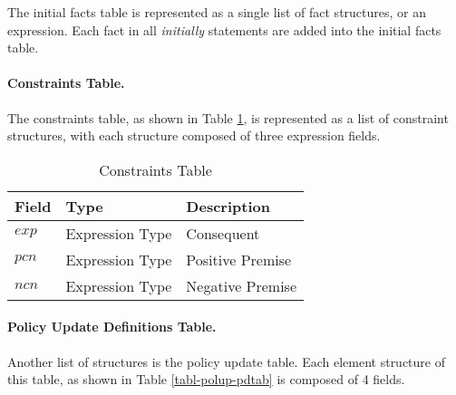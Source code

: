 \documentclass[11pt]{report}
\begin{document}
            The initial facts table is represented as a single list of
            fact structures, or an expression. Each fact in all {\em initially}
            statements are added into the initial facts table.

          \paragraph{Constraints Table.}

            The constraints table, as shown in Table \ref{tabl-polup-cntab}, is
            represented as a list of constraint structures, with each
            structure composed of three expression fields.

            \begin{table}[tbhp]
              \begin{center}
                \begin{tabular}[t]{|l|l|l|}
                  \hline
                  \textbf{Field} & \textbf{Type}   & \textbf{Description} \\
                  \hline
                  $exp$          & Expression Type & Consequent \\
                  \hline
                  $pcn$          & Expression Type & Positive Premise \\
                  \hline
                  $ncn$          & Expression Type & Negative Premise \\
                  \hline
                \end{tabular}
              \end{center}
              \caption{Constraints Table}
              \label{tabl-polup-cntab}
            \end{table}

          \paragraph{Policy Update Definitions Table.}

            Another list of structures is the policy update table. Each element
            structure of this table, as shown in Table \ref{tabl-polup-pdtab}
            is composed of 4 fields.
\end{document}
